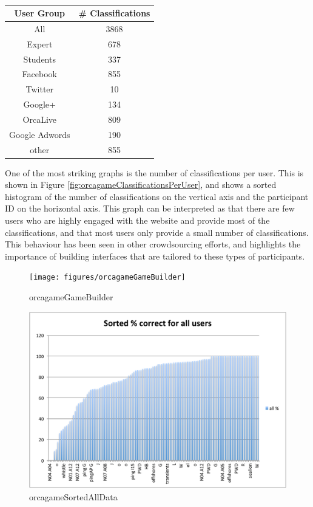 \documentclass[12pt,oneside]{book}
\begin{document}
\begin{table}
\begin{tabular}{|c|c|}
\hline
User Group      &   \# Classifications \\
\hline
All             &	3868               \\
Expert          &   678                \\
Students        &   337                \\
Facebook        &   855                \\
Twitter         &   10                 \\
Google+         &   134                \\
OrcaLive        &   809                \\
Google Adwords  &   190                \\
other           &   855                \\
\hline
\end{tabular}
\caption{}
\label{table:orcagameTotalNum}
\end{table}


One of the most striking graphs is the number of classifications per
user. This is shown in Figure
\ref{fig:orcagameClassificationsPerUser}, and shows a sorted histogram
of the number of classifications on the vertical axis and the
participant ID on the horizontal axis.  This graph can be interpreted
as that there are few users who are highly engaged with the website
and provide most of the classifications, and that most users only
provide a small number of classifications.  This behaviour has been
seen in other crowdsourcing efforts, and highlights the importance of
building interfaces that are tailored to these types of participants.
	

\begin{figure}[h]
\centering
\texttt{[image: figures/orcagameGameBuilder]}
\caption{orcagameGameBuilder}
\label{fig:orcagameGameBuilder}
\end{figure}


\begin{figure}[h]
\centering
\includegraphics[width=\columnwidth]{figures/orcagameSortedAllData}
\caption{orcagameSortedAllData}
\label{fig:orcagameSortedAllData}
\end{figure}
\end{document}
